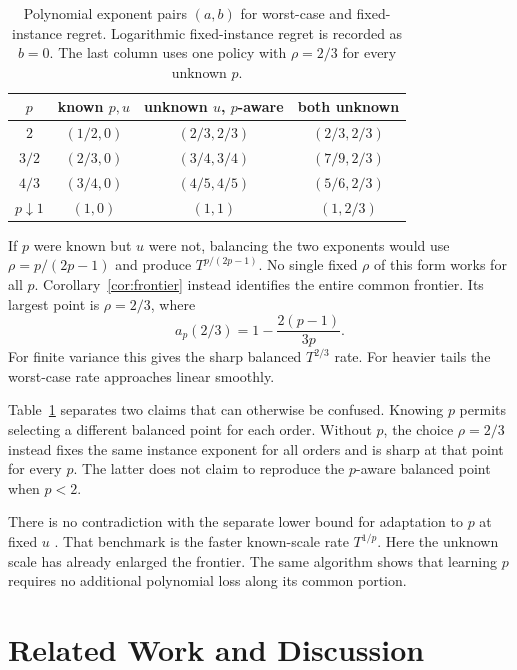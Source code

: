 \documentclass[twoside]{article}
\begin{document}
\begin{table}[t]
\caption{Polynomial exponent pairs $(a,b)$ for worst-case and fixed-instance
regret. Logarithmic fixed-instance regret is recorded as $b=0$. The last
column uses one policy with $\rho=2/3$ for every unknown $p$.}
\label{tab:exponents}
\centering
\scriptsize
\begin{tabular}{@{}cccc@{}}
\toprule
$p$ & known $p,u$ & unknown $u$, $p$-aware & both unknown\\
\midrule
$2$ & $(1/2,0)$ & $(2/3,2/3)$ & $(2/3,2/3)$\\
$3/2$ & $(2/3,0)$ & $(3/4,3/4)$ & $(7/9,2/3)$\\
$4/3$ & $(3/4,0)$ & $(4/5,4/5)$ & $(5/6,2/3)$\\
$p\downarrow1$ & $(1,0)$ & $(1,1)$ & $(1,2/3)$\\
\bottomrule
\end{tabular}
\end{table}

If $p$ were known but $u$ were not, balancing the two exponents would use
$\rho=p/(2p-1)$ and produce $T^{p/(2p-1)}$. No single fixed $\rho$ of this
form works for all $p$. Corollary~\ref{cor:frontier} instead identifies the
entire common frontier. Its largest point is $\rho=2/3$, where
\[
 a_p(2/3)=1-\frac{2(p-1)}{3p}.
\]
For finite variance this gives the sharp balanced $T^{2/3}$ rate. For
heavier tails the worst-case rate approaches linear smoothly.

Table~\ref{tab:exponents} separates two claims that can otherwise be confused.
Knowing $p$ permits selecting a different balanced point for each order.
Without $p$, the choice $\rho=2/3$ instead fixes the same instance exponent
for all orders and is sharp at that point for every $p$. The latter does not
claim to reproduce the $p$-aware balanced point when $p<2$.

There is no contradiction with the separate lower bound for adaptation to
$p$ at fixed $u$ \citep{genalti2024adaptive}. That benchmark is the faster
known-scale rate $T^{1/p}$. Here the unknown scale has already enlarged the
frontier. The same algorithm shows that learning $p$ requires no additional
polynomial loss along its common portion.

\section{Related Work and Discussion}
\label{sec:related}
\end{document}
